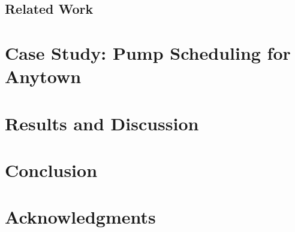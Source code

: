 \documentclass[english]{lni}
\begin{document}
\subsection{Related Work}
\label{sec:related_work}

\section{Case Study: Pump Scheduling for Anytown}
\label{sec:experimental_setup}

\section{Results and Discussion}
\label{sec:results_and_discussion}

\section{Conclusion}
\label{sec:conclusion}

\section{Acknowledgments}
\label{sec:acknowledgments}

\printbibliography
\end{document}
